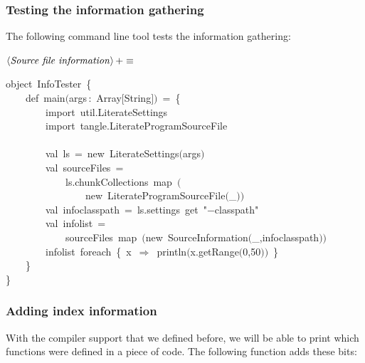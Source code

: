 \documentclass[a4paper,12pt]{article}
\begin{document}
\subsubsection{Testing the information gathering}
The following command line tool tests the information gathering:

$\left<\mbox{\emph{Source file information}}\right>+\equiv$
\begin{program}{\vem object}~InfoTester~{\small\{}
\\~~~~{\vem def}~main$($args\,{\rm :}~Array$[$String$]$$)$~=~{\small\{}
\\~~~~~~~~{\vem import}~util.LiterateSettings
\\~~~~~~~~{\vem import}~tangle.LiterateProgramSourceFile
\\[0.5em]
\\~~~~~~~~{\vem val}~ls~=~{\vem new}~LiterateSettings$($args$)$
\\[0.5em]~~~~~~~~{\vem val}~sourceFiles~=
\\~~~~~~~~~~~~ls.chunkCollections~map~$($
\\~~~~~~~~~~~~~~~~{\vem new}~LiterateProgramSourceFile$($\_$)$$)$
\\[0.5em]~~~~~~~~{\vem val}~infoclasspath~=~ls.settings~get~"$-$classpath"
\\[0.5em]~~~~~~~~{\vem val}~infolist~=
\\~~~~~~~~~~~~sourceFiles~map~$(${\vem new}~SourceInformation$($\_,infoclasspath$)$$)$
\\[0.5em]~~~~~~~~infolist~foreach~{\small\{}~x~$\Rightarrow$~println$($x.getRange$($0,50$)$$)$~{\small\}}
\\~~~~{\small\}}
\\{\small\}}
\\[0.5em]\end{program}
\subsubsection{Adding index information}
With the compiler support that we defined before, we will be able to print
which functions were defined in a piece of code. The following function adds
these bits:
\end{document}
